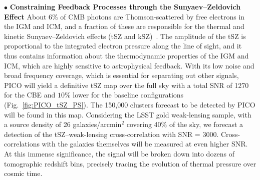 \documentclass[PICOAPC.tex]{subfiles}
\begin{document}





$\bullet$ {\bf Constraining Feedback Processes through the Sunyaev--Zeldovich Effect} \hspace{0.1in} \label{sec:sz}
About 6\% of CMB photons are Thomson-scattered by free electrons in the \ac{IGM} and \ac{ICM}, and a fraction of these are responsible for the thermal and kinetic Sunyaev--Zeldovich effects (tSZ and kSZ)~\citep{zeldovich69,SZ1972}. The amplitude of the tSZ is proportional to the integrated electron pressure along the line of sight, and it thus contains information about the thermodynamic properties of the \ac{IGM} and \ac{ICM}, which are highly sensitive to astrophysical feedback. With its low noise and broad frequency coverage, which is essential for separating out other signals, PICO will yield a definitive tSZ map over the full sky with a total \ac{SNR} of 1270 for the CBE and $10$\% lower for the baseline configurations (Fig.~\ref{fig:PICO_tSZ_PS}).   
The 150,000 clusters forecast to be detected by PICO will be found in this map.
Considering the LSST gold weak-lensing sample, with a source density of 26 galaxies/arcmin${}^2$ covering 40\% of the sky, we forecast a detection of the tSZ--weak-lensing cross-correlation with \ac{SNR} = 3000.  Cross-correlations with the galaxies themselves will be measured at even higher \ac{SNR}.  At this immense significance, the signal will be broken down into dozens of tomographic redshift bins, precisely tracing the evolution of thermal pressure over cosmic time.  
\end{document}

